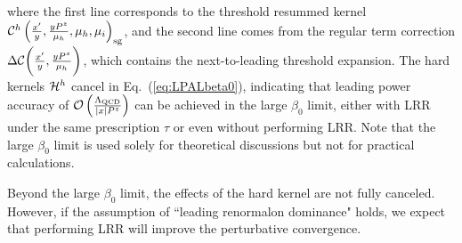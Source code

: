 \documentclass[a4paper,11pt]{article}
\begin{document}
where the first line corresponds to the threshold resummed kernel ${\cal C}^{h}\left(\frac{x'}{y},\frac{y P^z}{\mu_h},\mu_h,\mu_i\right)_{\rm sg}$, and the second line comes from the regular term correction $\Delta {\cal C}\bigg(\frac{x'}{y},\frac{y P^z}{\mu_h}\bigg)$, which contains the next-to-leading threshold expansion. 
The hard kernels ${\cal H}^{h}$ cancel in Eq.~(\ref{eq:LPALbeta0}), indicating that leading power accuracy of $\mathcal{O}\left(\frac{\Lambda_{\rm QCD}}{|x| P^z}\right)$ can be achieved in the large $\beta_0$ limit, either with LRR under the same prescription $\tau$ or even without performing LRR. Note that the large $\beta_0$ limit is used solely for theoretical discussions but not for practical calculations.

Beyond the large $\beta_0$ limit, the effects of the hard kernel are not fully canceled. However, if the assumption of ``leading renormalon dominance" holds, we expect that performing LRR will improve the perturbative convergence.




\end{document}
